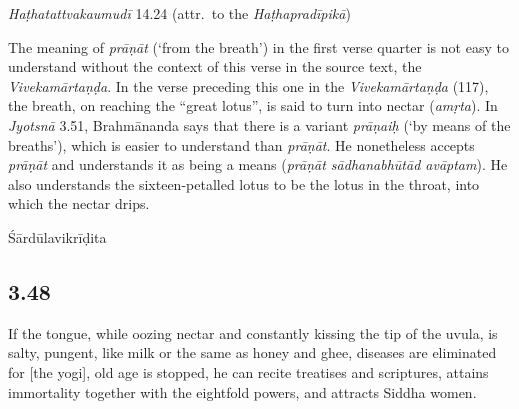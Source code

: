 \begin{ekdosis}
\begin{testimonia}[hp03_047]
\emph{Haṭhatattvakaumudī} 14.24 (attr.~to the \emph{Haṭhapradīpikā})
\begin{versinnote}
\tl{\var{ūrdhvaṃ ] mūrdhvaṃ \vl}\\!}
\end{versinnote}
\end{testimonia}

\begin{philcomm}[hp03_047]
The meaning of \emph{prāṇāt} (`from the breath') in the first verse quarter is not easy to understand without the context of this verse in the source text, the \emph{Vivekamārtaṇḍa}. In the verse preceding this one in the \emph{Vivekamārtaṇḍa} (117), the breath, on reaching the “great lotus”, is said to turn into nectar (\emph{amṛta}). In \emph{Jyotsnā} 3.51, Brahmānanda says that there is a variant \emph{prāṇaiḥ} (`by means of the breaths'), which is easier to understand than \emph{prāṇāt}. He nonetheless accepts \emph{prāṇāt} and understands it as being a means (\emph{prāṇāt sādhanabhūtād avāptam}). He also understands the sixteen-petalled lotus to be the lotus in the throat, into which the nectar drips.
\end{philcomm}

\begin{metre}[hp03_047]
Śārdūlavikrīḍita 
\end{metre}

\subsection*{3.48}
\begin{translation}[hp03_048]
If the tongue, while oozing nectar and constantly kissing the tip of the uvula, is salty, pungent, like  milk or the same as honey and ghee, diseases are eliminated for [the yogi], old age is stopped, he can recite treatises and scriptures, attains immortality together with the eightfold powers, and attracts Siddha women.
\end{translation}


\end{ekdosis}
